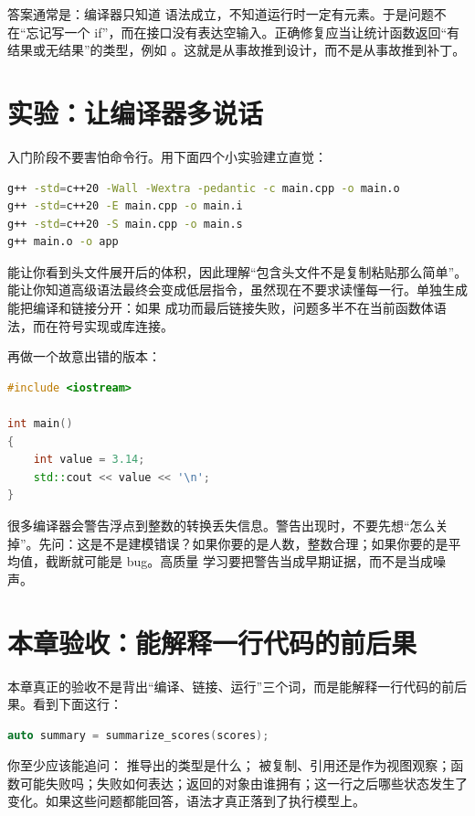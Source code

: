 答案通常是：编译器只知道  语法成立，不知道运行时一定有元素。于是问题不在“忘记写一个 if”，而在接口没有表达空输入。正确修复应当让统计函数返回“有结果或无结果”的类型，例如 。这就是从事故推到设计，而不是从事故推到补丁。

\section{实验：让编译器多说话}

入门阶段不要害怕命令行。用下面四个小实验建立直觉：

\begin{lstlisting}[language=bash,caption={观察预处理和警告}]
g++ -std=c++20 -Wall -Wextra -pedantic -c main.cpp -o main.o
g++ -std=c++20 -E main.cpp -o main.i
g++ -std=c++20 -S main.cpp -o main.s
g++ main.o -o app
\end{lstlisting}

 能让你看到头文件展开后的体积，因此理解“包含头文件不是复制粘贴那么简单”。 能让你知道高级语法最终会变成低层指令，虽然现在不要求读懂每一行。单独生成  能把编译和链接分开：如果  成功而最后链接失败，问题多半不在当前函数体语法，而在符号实现或库连接。

再做一个故意出错的版本：

\begin{lstlisting}[language=C++,caption={故意制造警告}]
#include <iostream>

int main()
{
    int value = 3.14;
    std::cout << value << '\n';
}
\end{lstlisting}

很多编译器会警告浮点到整数的转换丢失信息。警告出现时，不要先想“怎么关掉”。先问：这是不是建模错误？如果你要的是人数，整数合理；如果你要的是平均值，截断就可能是 bug。高质量 \cpp 学习要把警告当成早期证据，而不是当成噪声。

\section{本章验收：能解释一行代码的前后果}

本章真正的验收不是背出“编译、链接、运行”三个词，而是能解释一行代码的前后果。看到下面这行：

\begin{lstlisting}[language=C++,caption={一行代码的前后果}]
auto summary = summarize_scores(scores);
\end{lstlisting}

你至少应该能追问： 推导出的类型是什么； 被复制、引用还是作为视图观察；函数可能失败吗；失败如何表达；返回的对象由谁拥有；这一行之后哪些状态发生了变化。如果这些问题都能回答，语法才真正落到了执行模型上。
